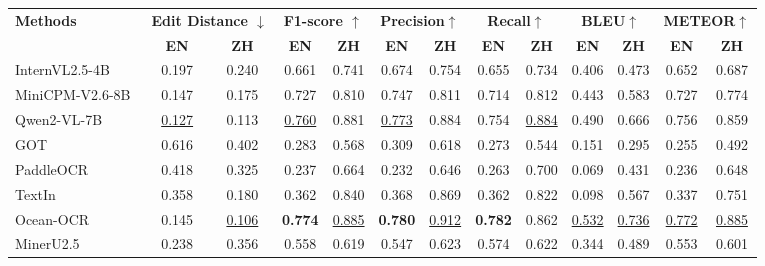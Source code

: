 \documentclass[11pt, a4paper,logo,  copyright, nonumbering]{paddleocr}
\begin{document}
\begin{table}[H]
 
    \centering
      \fontsize{7}{7}\selectfont

     \renewcommand{\arraystretch}{1.2}
    \begin{tabular}{l|cc|cc|cc|cc|cc|cc}
        \toprule
        \multirow{2}{*}{\textbf{Methods}}   & \multicolumn{2}{c|}{\textbf{Edit Distance $\downarrow$}}  & \multicolumn{2}{c|}{\textbf{F1-score $\uparrow$}} & \multicolumn{2}{c|}{\textbf{Precision$\uparrow$}} & \multicolumn{2}{c|}{\textbf{Recall$\uparrow$}} & \multicolumn{2}{c|}{\textbf{BLEU$\uparrow$}} & \multicolumn{2}{c}{\textbf{METEOR$\uparrow$}} \\
        \cline{2-3} \cline{4-5} \cline{6-7} \cline{8-9} \cline{10-11} \cline{12-13}  
        & \textbf{EN} & \textbf{ZH} & \textbf{EN} & \textbf{ZH} & \textbf{EN} & \textbf{ZH} & \textbf{EN} & \textbf{ZH} & \textbf{EN} & \textbf{ZH} & \textbf{EN} & \textbf{ZH}\\
        
        \midrule
    
        InternVL2.5-4B~\cite{InternVL}& 0.197 & 0.240 & 0.661 & 0.741 & 0.674 & 0.754 & 0.655 & 0.734 & 0.406 & 0.473 & 0.652 & 0.687 \\

        MiniCPM-V2.6-8B~\cite{yao2024minicpm}& 0.147 & 0.175 & 0.727 & 0.810 & 0.747 & 0.811 & 0.714 & 0.812 & 0.443 & 0.583 & 0.727 & 0.774\\
        Qwen2-VL-7B~\cite{qwen2}& \cellcolor{cyan!15}\underline{ 0.127} & 0.113 &  \cellcolor{cyan!15}\underline{0.760} & 0.881 &  \cellcolor{cyan!15}\underline{0.773} & 0.884 &  0.754 & \cellcolor{cyan!15}\underline{0.884} &  0.490 & 0.666 & 0.756 & 0.859\\
        \midrule
        GOT~\cite{wei2024general}& 0.616 & 0.402 & 0.283 & 0.568 & 0.309 & 0.618 & 0.273 & 0.544 & 0.151 & 0.295 & 0.255 & 0.492 \\
       PaddleOCR~\cite{cui2025paddleocr} & 0.418 & 0.325 & 0.237 & 0.664 & 0.232 & 0.646 & 0.263 & 0.700 & 0.069 & 0.431 & 0.236 & 0.648 \\ 
        TextIn & 0.358 & 0.180 & 0.362 & 0.840 & 0.368 & 0.869 & 0.362 & 0.822 & 0.098 & 0.567 & 0.337 & 0.751 \\
        Ocean-OCR~\cite{chen2025ocean} & 0.145 &  \cellcolor{cyan!15}\underline{0.106} & \cellcolor{red!15}\textbf {0.774} &  \cellcolor{cyan!15}\underline{0.885} & \cellcolor{red!15}\textbf {0.780} &  \cellcolor{cyan!15}\underline{0.912} &\cellcolor{red!15}\textbf { 0.782} &  0.862 &  \cellcolor{cyan!15}\underline{0.532} &  \cellcolor{cyan!15}\underline{0.736} &  \cellcolor{cyan!15}\underline{0.772} &  \cellcolor{cyan!15}\underline{0.885} \\
        \midrule
        MinerU2.5~\cite{niu2025mineru2} & 0.238 & 0.356 & 0.558 & 0.619 & 0.547 & 0.623  & 0.574 &  0.622 & 0.344 & 0.489  & 0.553 & 0.601 \\


\end{tabular}
\end{table}
\end{document}
